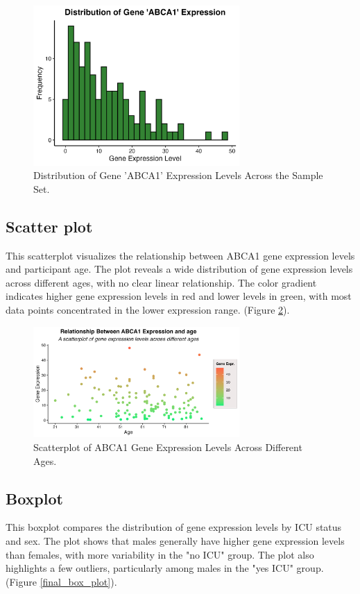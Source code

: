 \documentclass[12pt]{article}
\begin{document}
\begin{figure}[H]
    \centering
    \includegraphics[width=0.7\textwidth, height=0.4\textheight]{final_bar_char.png}
    \caption{Distribution of Gene 'ABCA1' Expression Levels Across the Sample Set.}
    \label{final_bar_char}
\end{figure}

\subsection{Scatter plot}
This scatterplot visualizes the relationship between ABCA1 gene expression levels and participant age. The plot reveals a wide distribution of gene expression levels across different ages, with no clear linear relationship. The color gradient indicates higher gene expression levels in red and lower levels in green, with most data points concentrated in the lower expression range. (Figure \ref{final_scatter}).

\begin{figure}[H]
    \centering
    \includegraphics[width=0.7\textwidth, height=0.3\textheight]{final_scatter.png}
    \caption{Scatterplot of ABCA1 Gene Expression Levels Across Different Ages.}
    \label{final_scatter}
\end{figure}

\subsection{Boxplot}
This boxplot compares the distribution of gene expression levels by ICU status and sex. The plot shows that males generally have higher gene expression levels than females, with more variability in the "no ICU" group. The plot also highlights a few outliers, particularly among males in the "yes ICU" group. (Figure \ref{final_box_plot}).
\end{document}

